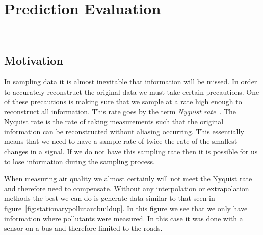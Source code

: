 \chapter{Prediction Evaluation}\label{prediction_evaluation}

	\

	\section{Motivation}\label{prediction_evaluation_motivation}

		In sampling data it is almost inevitable that information will be missed. In order to accurately reconstruct the original data we must take certain precautions. One of these precautions is making sure that we sample at a rate high enough to reconstruct all information. This rate goes by the term \emph{Nyquist rate}~\cite{nyquistrate}. The Nyquist rate is the rate of taking measurements such that the original information can be reconstructed without aliasing occurring. This essentially means that we need to have a sample rate of twice the rate of the smallest changes in a signal. If we do not have this sampling rate then it is possible for us to lose information during the sampling process. 


		When measuring air quality we almost certainly will not meet the Nyquist rate and therefore need to compensate. Without any interpolation or extrapolation methods the best we can do is generate data similar to that seen in figure~\ref{fig:stationarypollutantbuildup}. In this figure we see that we only have information where pollutants were measured. In this case it was done with a sensor on a bus and therefore limited to the roads. 


